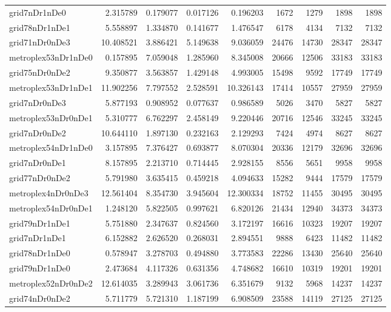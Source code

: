 \begin{longtable}{|l|r|r|r|r|r|r|r|r|}
grid7nDr1nDe0 & 2.315789 & 0.179077 & 0.017126 & 0.196203 & 1672 & 1279 & 1898 & 1898 \\
grid78nDr1nDe1 & 5.558897 & 1.334870 & 0.141677 & 1.476547 & 6178 & 4134 & 7132 & 7132 \\
grid71nDr0nDe3 & 10.408521 & 3.886421 & 5.149638 & 9.036059 & 24476 & 14730 & 28347 & 28347 \\
metroplex53nDr1nDe0 & 0.157895 & 7.059048 & 1.285960 & 8.345008 & 20666 & 12506 & 33183 & 33183 \\
grid75nDr0nDe2 & 9.350877 & 3.563857 & 1.429148 & 4.993005 & 15498 & 9592 & 17749 & 17749 \\
metroplex53nDr1nDe1 & 11.902256 & 7.797552 & 2.528591 & 10.326143 & 17414 & 10557 & 27959 & 27959 \\
grid7nDr0nDe3 & 5.877193 & 0.908952 & 0.077637 & 0.986589 & 5026 & 3470 & 5827 & 5827 \\
metroplex53nDr0nDe1 & 5.310777 & 6.762297 & 2.458149 & 9.220446 & 20716 & 12546 & 33245 & 33245 \\
grid7nDr0nDe2 & 10.644110 & 1.897130 & 0.232163 & 2.129293 & 7424 & 4974 & 8627 & 8627 \\
metroplex54nDr1nDe0 & 3.157895 & 7.376427 & 0.693877 & 8.070304 & 20336 & 12179 & 32696 & 32696 \\
grid7nDr0nDe1 & 8.157895 & 2.213710 & 0.714445 & 2.928155 & 8556 & 5651 & 9958 & 9958 \\
grid77nDr0nDe2 & 5.791980 & 3.635415 & 0.459218 & 4.094633 & 15282 & 9444 & 17579 & 17579 \\
metroplex4nDr0nDe3 & 12.561404 & 8.354730 & 3.945604 & 12.300334 & 18752 & 11455 & 30495 & 30495 \\
metroplex54nDr0nDe1 & 1.248120 & 5.822505 & 0.997621 & 6.820126 & 21434 & 12940 & 34373 & 34373 \\
grid79nDr1nDe1 & 5.751880 & 2.347637 & 0.824560 & 3.172197 & 16616 & 10323 & 19207 & 19207 \\
grid7nDr1nDe1 & 6.152882 & 2.626520 & 0.268031 & 2.894551 & 9888 & 6423 & 11482 & 11482 \\
grid78nDr1nDe0 & 0.578947 & 3.278703 & 0.494880 & 3.773583 & 22286 & 13430 & 25640 & 25640 \\
grid79nDr1nDe0 & 2.473684 & 4.117326 & 0.631356 & 4.748682 & 16610 & 10319 & 19201 & 19201 \\
metroplex52nDr0nDe2 & 12.614035 & 3.289943 & 3.061736 & 6.351679 & 9132 & 5968 & 14237 & 14237 \\
grid74nDr0nDe2 & 5.711779 & 5.721310 & 1.187199 & 6.908509 & 23588 & 14119 & 27125 & 27125 \\

\end{longtable}
